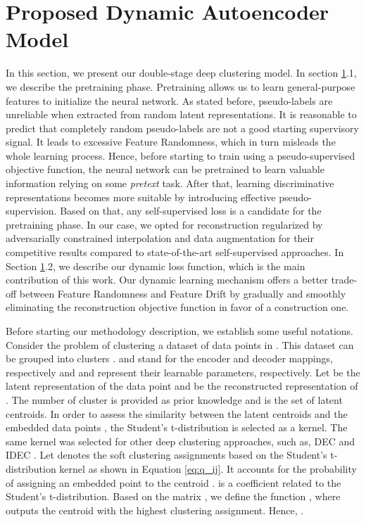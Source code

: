 \documentclass{article}
\begin{document}
\section{Proposed Dynamic Autoencoder Model}
\label{Sec:methodoloy}
In this section, we present our double-stage deep clustering model. In section \ref{Sec:methodoloy}.1, we describe the pretraining phase. Pretraining allows us to learn general-purpose features to initialize the neural network. As stated before, pseudo-labels are unreliable when extracted from random latent representations. It is reasonable to predict that completely random pseudo-labels are not a good starting supervisory signal. It leads to excessive Feature Randomness, which in turn misleads the whole learning process. Hence, before starting to train using a pseudo-supervised objective function, the neural network can be pretrained to learn valuable information relying on some \textit{pretext} task. After that, learning discriminative representations becomes more suitable by introducing effective pseudo-supervision. Based on that, any self-supervised loss is a candidate for the pretraining phase. In our case, we opted for reconstruction regularized by adversarially constrained interpolation and data augmentation for their competitive results compared to state-of-the-art self-supervised approaches. In Section \ref{Sec:methodoloy}.2, we describe our dynamic loss function, which is the main contribution of this work. Our dynamic learning mechanism offers a better trade-off between Feature Randomness and Feature Drift by gradually and smoothly eliminating the reconstruction objective function in favor of a construction one. 

Before starting our methodology description, we establish some useful notations.
Consider the problem of clustering a dataset   of  data points in . This dataset can be grouped into  clusters .  and   stand for the encoder and decoder mappings, respectively and  and  represent their learnable parameters, respectively. Let  be the latent representation of the data point  and  be the reconstructed representation of . The number of cluster  is provided as prior knowledge and  is the set of latent centroids. In order to assess the similarity between the latent centroids  and the embedded data points , the Student’s t-distribution is selected as a kernel. The same kernel was selected for other deep clustering approaches, such as, DEC \cite{paper27} and IDEC \cite{paper28}. Let  denotes the soft clustering assignments based on the Student’s t-distribution kernel as shown in Equation \ref{eq:q_ij}. It accounts for the probability of assigning an embedded point  to the centroid .  is a coefficient related to the Student’s t-distribution. Based on the matrix , we define the function , where  outputs the centroid with the highest clustering assignment. Hence, .
\end{document}
